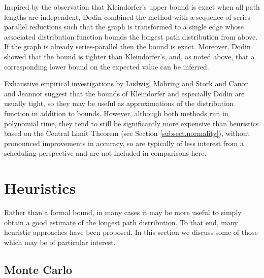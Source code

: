 \documentclass[12pt]{article}
\begin{document}
Inspired by the observation that Kleindorfer's upper bound is exact when all path lengths are independent, Dodin \cite{dod85} combined the method with a sequence of series-parallel reductions such that the graph is transformed to a single edge whose associated distribution function bounds the longest path distribution from above. If the graph is already series-parallel then the bound is exact. Moreover, Dodin showed that the bound is tighter than Kleindorfer's, and, as noted above, that a corresponding lower bound on the expected value can be inferred.

Exhaustive empirical investigations by Ludwig, M{\"o}hring and Stork \cite{lud01} and Canon and Jeannot \cite{can16} suggest that the bounds of Kleindorfer and especially Dodin are usually tight, so they may be useful as approximations of the distribution function in addition to bounds. However, although both methods run in polynomial time, they tend to still be significantly more expensive than heuristics based on the Central Limit Theorem (see Section \ref{subsect.normality}), without pronounced improvements in accuracy, so are typically of less interest from a scheduling perspective and are not included in comparisons here. 


\section{Heuristics}
\label{sect.heuristics}

Rather than a formal bound, in many cases it may be more useful to simply obtain a good estimate of the longest path distribution. To that end, many heuristic approaches have been proposed. In this section we discuss some of those which may be of particular interest.

\subsection{Monte Carlo}
\label{subsect.monte_carlo} 

\end{document}
